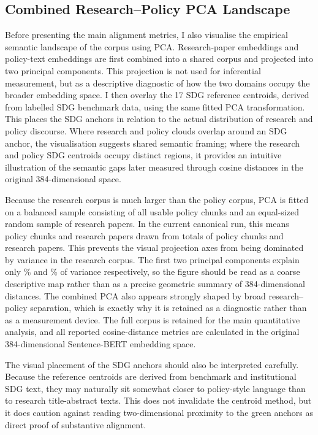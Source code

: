 \documentclass[12pt,a4paper]{article}
\begin{document}
\subsection{Combined Research--Policy PCA Landscape}

Before presenting the main alignment metrics, I also visualise the empirical semantic landscape of the corpus using PCA. Research-paper embeddings and policy-text embeddings are first combined into a shared corpus and projected into two principal components. This projection is not used for inferential measurement, but as a descriptive diagnostic of how the two domains occupy the broader embedding space. I then overlay the 17 SDG reference centroids, derived from labelled SDG benchmark data, using the same fitted PCA transformation. This places the SDG anchors in relation to the actual distribution of research and policy discourse. Where research and policy clouds overlap around an SDG anchor, the visualisation suggests shared semantic framing; where the research and policy SDG centroids occupy distinct regions, it provides an intuitive illustration of the semantic gaps later measured through cosine distances in the original 384-dimensional space.

Because the research corpus is much larger than the policy corpus, PCA is fitted on a balanced sample consisting of all usable policy chunks and an equal-sized random sample of research papers. In the current canonical run, this means \PcaLandscapePolicyFitN{} policy chunks and \PcaLandscapeResearchFitN{} research papers drawn from totals of \PcaLandscapeTotalPolicy{} policy chunks and \PcaLandscapeTotalResearch{} research papers. This prevents the visual projection axes from being dominated by variance in the research corpus. The first two principal components explain only \PcaLandscapePcOnePct\% and \PcaLandscapePcTwoPct\% of variance respectively, so the figure should be read as a coarse descriptive map rather than as a precise geometric summary of 384-dimensional distances. The combined PCA also appears strongly shaped by broad research--policy separation, which is exactly why it is retained as a diagnostic rather than as a measurement device. The full corpus is retained for the main quantitative analysis, and all reported cosine-distance metrics are calculated in the original 384-dimensional Sentence-BERT embedding space.

The visual placement of the SDG anchors should also be interpreted carefully. Because the reference centroids are derived from benchmark and institutional SDG text, they may naturally sit somewhat closer to policy-style language than to research title-abstract texts. This does not invalidate the centroid method, but it does caution against reading two-dimensional proximity to the green anchors as direct proof of substantive alignment.
\end{document}

